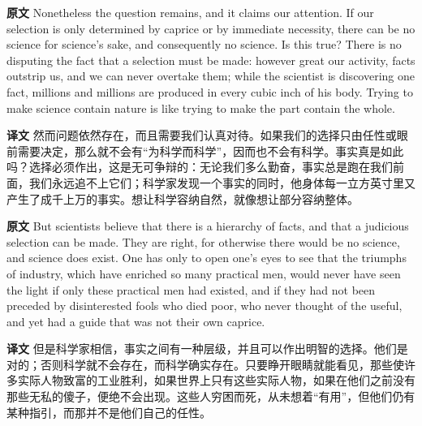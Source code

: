 \documentclass[UTF8,zihao=-4]{ctexart}
\newcommand{\BodyFont}{\fontsize{10.5pt}{15.5pt}\selectfont}
\newcommand{\origlabel}{\textbf{原文}\quad}
\newcommand{\translabel}{\textbf{译文}\quad}
\newenvironment{enblock}{\par\noindent\begingroup\BodyFont\origlabel}{\par\endgroup}
\newenvironment{zhblock}{\par\noindent\begingroup\BodyFont\translabel}{\par\endgroup\vspace{0.35em}}
\begin{document}
\begin{enblock}
Nonetheless the question remains, and it claims our attention. If our selection is only determined by caprice or by immediate necessity, there can be no science for science's sake, and consequently no science. Is this true? There is no disputing the fact that a selection must be made: however great our activity, facts outstrip us, and we can never overtake them; while the scientist is discovering one fact, millions and millions are produced in every cubic inch of his body. Trying to make science contain nature is like trying to make the part contain the whole.
\end{enblock}
\begin{zhblock}
然而问题依然存在，而且需要我们认真对待。如果我们的选择只由任性或眼前需要决定，那么就不会有“为科学而科学”，因而也不会有科学。事实真是如此吗？选择必须作出，这是无可争辩的：无论我们多么勤奋，事实总是跑在我们前面，我们永远追不上它们；科学家发现一个事实的同时，他身体每一立方英寸里又产生了成千上万的事实。想让科学容纳自然，就像想让部分容纳整体。\end{zhblock}

\begin{enblock}
But scientists believe that there is a hierarchy of facts, and that a judicious selection can be made. They are right, for otherwise there would be no science, and science does exist. One has only to open one's eyes to see that the triumphs of industry, which have enriched so many practical men, would never have seen the light if only these practical men had existed, and if they had not been preceded by disinterested fools who died poor, who never thought of the useful, and yet had a guide that was not their own caprice.
\end{enblock}
\begin{zhblock}
但是科学家相信，事实之间有一种层级，并且可以作出明智的选择。他们是对的；否则科学就不会存在，而科学确实存在。只要睁开眼睛就能看见，那些使许多实际人物致富的工业胜利，如果世界上只有这些实际人物，如果在他们之前没有那些无私的傻子，便绝不会出现。这些人穷困而死，从未想着“有用”，但他们仍有某种指引，而那并不是他们自己的任性。\end{zhblock}
\end{document}
